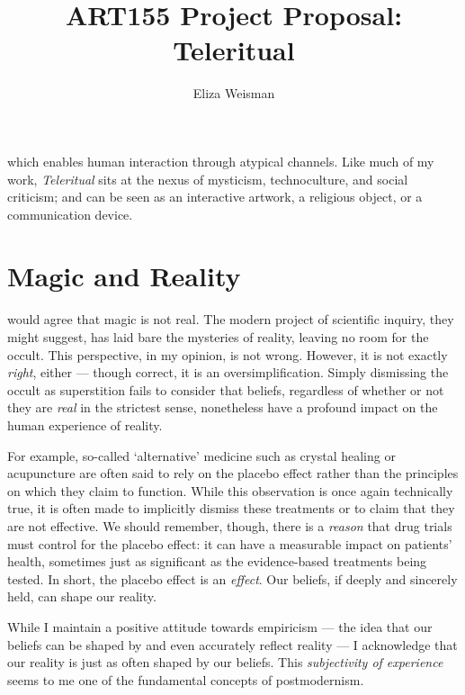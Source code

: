 \documentclass[a4paper,nobib]{tufte-handout}
\title[Teleritual]{\textbf{ART155 Project Proposal:} Teleritual}
\author{Eliza Weisman}
\begin{document}
\maketitle

 which enables human interaction through atypical channels. Like much of my work, \textit{Teleritual} sits at the nexus of mysticism, technoculture, and social criticism; and can be seen as an interactive artwork, a religious object, or a communication device.


\section{Magic and Reality}

 would agree that magic is not real. The modern project of scientific inquiry, they might suggest, has laid bare the mysteries of reality, leaving no room for the occult. This perspective, in my opinion, is not wrong. However, it is not exactly \emph{right}, either --- though correct, it is an oversimplification. Simply dismissing the occult as superstition fails to consider that beliefs, regardless of whether or not they are \emph{real} in the strictest sense, nonetheless have a profound impact on the human experience of reality.

For example, so-called `alternative' medicine such as crystal healing or acupuncture are often said to rely on the placebo effect rather than the principles on which they claim to function. While this observation is once again technically true, it is often made to implicitly dismiss these treatments or to claim that they are not effective.  We should remember, though, there is a \emph{reason} that drug trials must control for the placebo effect: it can have a measurable impact on patients' health, sometimes just as significant as the evidence-based treatments being tested. In short, the placebo effect is an \emph{effect}. Our beliefs, if deeply and sincerely held, can shape our reality.

While I maintain a positive attitude towards empiricism --- the idea that our beliefs can be shaped by and even accurately reflect reality\autocite{sep:logicalempiricism} --- I acknowledge that our reality is just as often shaped by our beliefs. This \emph{subjectivity of experience}\autocite{nagel1974like} seems to me one of the fundamental concepts of postmodernism.
\end{document}
